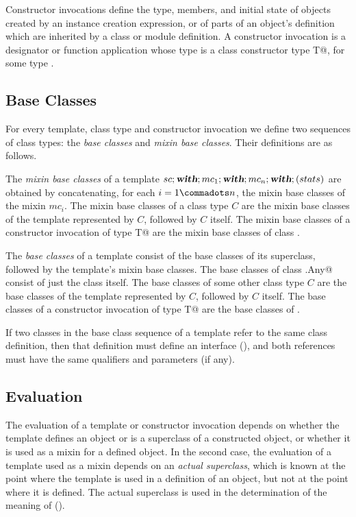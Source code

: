 \documentclass[11pt]{report}
\begin{document}
Constructor invocations define the type, members, and initial state of
objects created by an instance creation expression, or of parts of an
object's definition which are inherited by a class or module
definition. A constructor invocation is a designator or function
application whose type is a class constructor type \verb@class T@, for
some type \verb@T@.

\subsection{Base Classes}
\label{sec:base-classes}

For every template, class type and constructor invocation we define two
sequences of class types: the {\em base classes} and {\em mixin base
classes}. Their definitions are as follows.

The {\em mixin base classes} of a template
$sc;\mbox{\sl\bfseries with};mc_1;\mbox{\sl\bfseries with};mc_n;\mbox{\sl\bfseries with};(stats)$ are obtained by
concatenating, for each $i = 1 \commadots n$, the mixin base classes
of the mixin $mc_i$. The mixin base classes of a class type $C$ are
the mixin base classes of the template represented by $C$, followed by
$C$ itself. The mixin base classes of a constructor invocation of type
\verb@class T@ are the mixin base classes of class \verb@T@.

The {\em base classes} of a template consist of the base classes of
its superclass, followed by the template's mixin base classes.  The
base classes of class \verb@scala.Any@ consist of just the
class itself. The base classes of some other class type $C$ are the
base classes of the template represented by $C$, followed by $C$
itself.  The base classes of a constructor invocation of type \verb@class T@
are the base classes of \verb@T@.

If two classes in the base class sequence of a template refer to the
same class definition, then that definition must define an interface
(), and both references must have the same
qualifiers and parameters (if any).

\subsection{Evaluation}

The evaluation of a template or constructor invocation depends on
whether the template defines an object or is a superclass of a
constructed object, or whether it is used as a mixin for a defined
object.  In the second case, the evaluation of a template used as a
mixin depends on an {\em actual superclass}, which is known at the
point where the template is used in a definition of an object, but not
at the point where it is defined. The actual superclass is used in the
determination of the meaning of \verb@super@ ().
\end{document}
